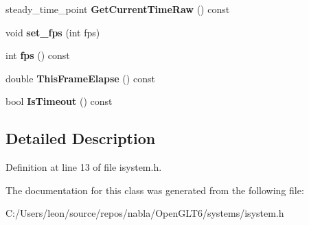 \begin{DoxyCompactItemize}
steady\+\_\+time\+\_\+point {\bfseries Get\+Current\+Time\+Raw} () const
\item 
\mbox{\label{classnabla_1_1_clock_a33ba71b8c523235fbbd10946ea41eaf0}} 
void {\bfseries set\+\_\+fps} (int fps)
\item 
\mbox{\label{classnabla_1_1_clock_aeb7b19b6b52440dec5b1e90166afbd3d}} 
int {\bfseries fps} () const
\item 
\mbox{\label{classnabla_1_1_clock_a6f2508fa908412e6f8774df0c5d2bd0b}} 
double {\bfseries This\+Frame\+Elapse} () const
\item 
\mbox{\label{classnabla_1_1_clock_a4bc632657e7e4991bb3170f1f0f46c8c}} 
bool {\bfseries Is\+Timeout} () const
\end{DoxyCompactItemize}


\subsection{Detailed Description}


Definition at line 13 of file isystem.\+h.



The documentation for this class was generated from the following file\+:\begin{DoxyCompactItemize}
\item 
C\+:/\+Users/leon/source/repos/nabla/\+Open\+G\+L\+T6/systems/isystem.\+h\end{DoxyCompactItemize}
